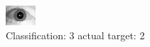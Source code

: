 \begin{figure}[h!]
\begin{center}
\includegraphics[width=0.60\columnwidth]{figures/ID1735_class_3_target_2.png}
\end{center}
\caption{ Classification: 3 actual target: 2}
\label{fig:ID1735_class_3_target_2}
\end{figure}
